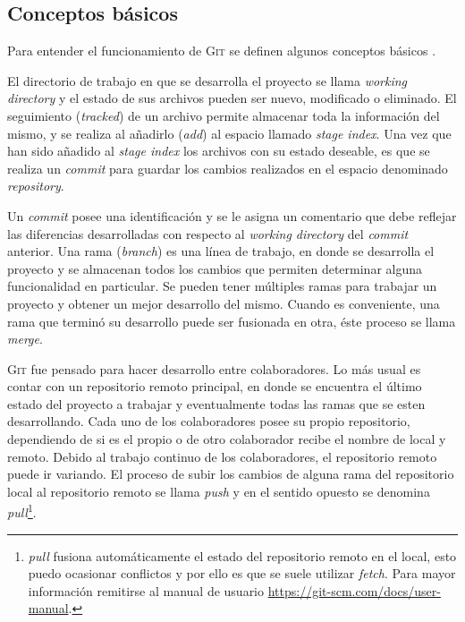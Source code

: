 \subsection{Conceptos básicos}

Para entender el funcionamiento de \textsc{Git} se definen algunos conceptos básicos \cite{user:2020:git}. 

El directorio de trabajo en que se desarrolla el proyecto se llama \textit{working directory} y el estado de sus archivos pueden ser nuevo, modificado o eliminado. El seguimiento (\textit{tracked}) de un archivo permite almacenar toda la información del mismo, y se realiza al añadirlo (\textit{add}) al espacio llamado \textit{stage index}. Una vez que han sido añadido al \textit{stage index} los archivos con su estado deseable, es que se realiza un \textit{commit} para guardar los cambios realizados en el espacio denominado \textit{repository}.

Un \textit{commit} posee una identificación y se le asigna un comentario que debe reflejar las diferencias desarrolladas con respecto al \textit{working directory} del \textit{commit} anterior. Una rama (\textit{branch}) es una línea de trabajo, en donde se desarrolla el proyecto y se almacenan todos los cambios que permiten determinar alguna funcionalidad en particular. Se pueden tener múltiples ramas para trabajar un proyecto y obtener un mejor desarrollo del mismo. Cuando es conveniente, una rama que terminó su desarrollo puede ser fusionada en otra, éste proceso se llama \textit{merge}.

\textsc{Git} fue pensado para hacer desarrollo entre colaboradores. Lo más usual es contar con un repositorio remoto principal, en donde se encuentra el último estado del proyecto a trabajar y eventualmente todas las ramas que se esten desarrollando. Cada uno de los colaboradores posee su propio repositorio, dependiendo de si es el propio o de otro colaborador recibe el nombre de local y remoto. Debido al trabajo continuo de los colaboradores, el repositorio remoto puede ir variando. El proceso de subir los cambios de alguna rama del repositorio local  al repositorio remoto  se llama \textit{push} y en el sentido opuesto se denomina \textit{pull}\footnote{\textit{pull} fusiona automáticamente el estado del repositorio remoto en el local, esto puedo ocasionar conflictos y por ello es que se suele utilizar \textit{fetch}. Para mayor información remitirse al manual de usuario \url{https://git-scm.com/docs/user-manual}.}. 


